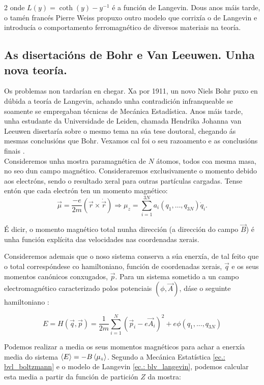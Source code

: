 \begin{refsection}
\begin{multicols}{2}
onde $L(y) = \coth(y)-y^{-1}$ é a función de Langevin. Dous anos máis tarde, o
tamén francés Pierre Weiss propuxo outro modelo que corrixía o de Langevin e
introducía o comportamento ferromagnético de diversos materiais na teoría.

\subsection*{As disertacións de Bohr e Van Leeuwen. Unha nova teoría.}

Os problemas non tardarían en chegar. Xa por 1911, un novo Niels Bohr puxo en
dúbida a teoría de Langevin, achando unha contradición infranqueable se
soamente se empregaban técnicas de Mecánica Estadística. Anos máis tarde, unha
estudante da Universidade de Leiden, chamada Hendrika Johanna van Leeuwen
disertaría sobre o mesmo tema na súa tese doutoral, chegando ás mesmas
conclusións que Bohr. Vexamos cal foi o seu razoamento e as conclusións finais
\cite[Sec. 1.2.2.]{blundell.s_2001}.\\

Consideremos unha mostra paramagnética de $N$ átomos, todos coa mesma masa, no
seo dun campo magnético. Consideraremos exclusivamente o momento debido aos
electróns, sendo o resultado xeral para outras partículas cargadas. Tense entón
que cada electrón ten un momento magnético:
$$\vec \mu = \frac{-e}{2m} ({\vec r}\times \dot {\vec r}) \Rightarrow
\mu_z=\sum_{i=1}^{3N}a_i(q_1,\dots,q_{3N})\dot q_i.$$

É dicir, o momento magnético total nunha dirección (a dirección do campo $\vec
B$) é unha función explícita das velocidades nas coordenadas xerais.

Consideremos ademais que o noso sistema conserva a súa enerxía, de tal feito
que o total correspóndese co hamiltoniano, función de coordenadas xerais, $\vec
q$ e os seus momentos canónicos conxugados, $\vec p$. Para un sistema sometido
a un campo electromagnético caracterizado polos potenciais $(\phi,\vec A)$,
dáse o seguinte hamiltoniano :

\begin{equation}\label{ec.: bvl_hamiltoniano}
    E=H(\vec q,\vec p) = \frac{1}{2m}\sum_{i=1}^N (\vec p_i - e\vec
    A_i)^2 + e\phi(q_1,...,q_{3N})
\end{equation}

Podemos realizar a media os seus momentos magnéticos para achar a enerxía media do
sistema $\braket{E} = -B\braket{\mu_z}$. Segundo a Mecánica Estatística
\eqref{ec.: bvl_boltzmann} e o modelo de Langevin \eqref{ec.: blv_langevin},
podemos calcular esta media a partir da función de partición $Z$ da mostra:


\end{multicols}
\end{refsection}
